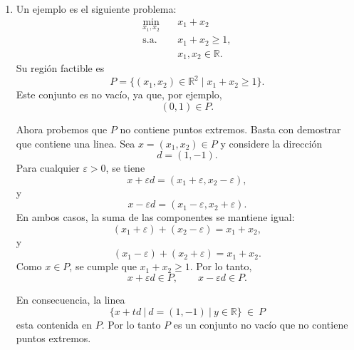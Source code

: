 \begin{enumerate}
    En conclusión, el problema tiene solución óptima si y solo si
    \[
        A^{-1}b \geq 0.
    \]
    En tal caso, existe una única solución óptima:
    \[
        x^\star = A^{-1}b.
    \]

\item
Un ejemplo es el siguiente problema:
    \[
        \begin{aligned}
            \min_{x_1,x_2} \quad & x_1+x_2 \\
            \text{s.a.} \quad & x_1 + x_2 \geq 1, \\
            & x_1,x_2 \in \mathbb{R}.
        \end{aligned}
    \]
    Su región factible es
    \[
        P = \{(x_1,x_2) \in \mathbb{R}^2 \mid x_1+x_2 \geq 1\}.
    \]
    Este conjunto es no vacío, ya que, por ejemplo,
    \[
        (0,1) \in P.
    \]

    Ahora probemos que $P$ no contiene puntos extremos. Basta con demostrar que contiene una linea. Sea $x=(x_1,x_2) \in P$ y considere
    la dirección
    \[
        d = (1,-1).
    \]
    Para cualquier $\varepsilon > 0$, se tiene
    \[
        x+\varepsilon d = (x_1+\varepsilon, x_2-\varepsilon),
    \]
    y
    \[
        x-\varepsilon d = (x_1-\varepsilon, x_2+\varepsilon).
    \]
    En ambos casos, la suma de las componentes se mantiene igual:
    \[
        (x_1+\varepsilon)+(x_2-\varepsilon) = x_1+x_2,
    \]
    y
    \[
        (x_1-\varepsilon)+(x_2+\varepsilon) = x_1+x_2.
    \]
    Como $x \in P$, se cumple que $x_1+x_2 \geq 1$. Por lo tanto,
    \[
        x+\varepsilon d \in P,
        \qquad
        x-\varepsilon d \in P.
    \]

    En consecuencia, la linea
    \[
    \{x+td\:|\:d=(1,-1) \: | \:y \in \mathbb{R}\}\:\in \:P
    \]
    esta contenida en $P$. Por lo tanto $P$ es un conjunto no vacío que no contiene puntos extremos.

\end{enumerate}
